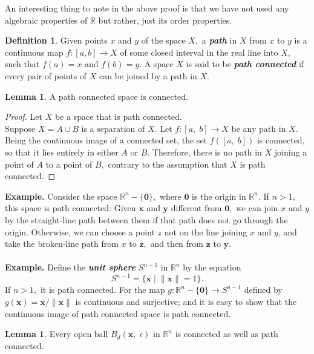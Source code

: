 \documentclass{article}
\theoremstyle{definition}
\newtheorem{lem}[theorem]{Lemma}
\newtheorem{defn}[theorem]{Definition}
\begin{document}
An interesting thing to note in the above proof is that we have not used any algebraic properties of $\mathbb{R}$ but rather, just its order properties.\\
%
\begin{defn}
  Given points $x$ and $y$ of the space $X,$ a \textbf{\emph{path}} in $X$ from $x$ to $y$ is a continuous map $f:[a, b] \longrightarrow X$ of some closed interval in the real line into $X,$ such that $f(a) = x$ and $f(b) = y.$ A space $X$ is said to be \textbf{\emph{path connected}} if every pair of points of $X$ can be joined by a path in $X.$
\end{defn}
%
\begin{lem}
  A path connected space is connected.
\end{lem}
\begin{proof}
  Let $X$ be a space that is path connected.\\
  Suppose $X = A \cup B$ is a separation of $X.$ Let $f:[a,\;b] \longrightarrow X$ be any path in $X.$ Being the continuous image of a connected set, the set $f([a,\;b])$ is connected, so that it lies entirely in either $A$ or $B.$ Therefore, there is no path in $X$ joining a point of $A$ to a point of $B,$ contrary to the assumption that $X$ is path connected.
\end{proof}
%
\textbf{Example.} Consider the space $\mathbb{R}^n - \{\mathbf{0}\},$ where $\mathbf{0}$ is the origin in $\mathbb{R}^n.$ If $n > 1,$ this space is path connected: Given $\mathbf{x}$ and $\mathbf{y}$ different from $\mathbf{0},$ we can join \textbf{$x$} and \textbf{$y$} by the straight-line path between them if that path does not go through the origin. Otherwise, we can choose a point \textbf{$z$} not on the line joining \textbf{$x$} and \textbf{$y$}, and take the broken-line path from \textbf{$x$} to $\textbf{z},$ and then from $\textbf{z}$ to $\textbf{y}.$\\~\\
%
\textbf{Example.} Define the \textbf{\emph{unit sphere}} $S^{n-1}$ in $\mathbb{R}^n$ by the equation
\[S^{n-1} = \{\textbf{x} \;|\; \|\textbf{x}\| = 1\}.\]
If $n > 1,$ it is path connected. For the map $g : \mathbb{R}^n - \{\mathbf{0}\} \longrightarrow S^{n-1}$ defined by $g(\textbf{x}) = \textbf{x}/\|\textbf{x}\|$ is continuous and surjective; and it is easy to show that the continuous image of path connected space is path connected.
%
\begin{lem}\label{lem:connected balls}
  Every open ball $B_d(\textbf{x},\;\epsilon)$ in $\mathbb{R}^n$ is connected as well as path connected.
\end{lem}
\end{document}
